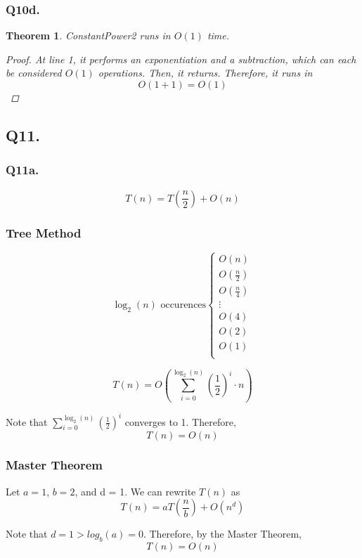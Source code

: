 \documentclass{article}
\newtheorem{theorem}{Theorem}
\theoremstyle{definition}
\begin{document}
\subsubsection{Q10d.}
\begin{theorem}
    ConstantPower2 runs in $O(1)$ time. 
    \begin{proof}
        At line 1, it performs an exponentiation and a subtraction, which can each be considered $O(1)$ operations. Then, it returns. Therefore, it runs in 
        $$O(1 + 1) = O(1)$$
    \end{proof}
\end{theorem}

\subsection{Q11.}
\subsubsection{Q11a.}
$$T(n) = T\left(\frac{n}{2}\right) + O(n)$$

\subsubsection*{Tree Method}
$$\log_2(n)\text{ occurences} \begin{cases}
    O(n)  \\
    O(\frac{n}{2})  \\
    O(\frac{n}{4})  \\
    \vdots \\
    O(4)  \\
    O(2)  \\
    O(1)  \\
\end{cases}$$

$$T(n) = O\left( \sum^{\log_2(n)}_{i=0} \left( \frac{1}{2} \right)^i \cdot n \right)$$

Note that $\sum^{\log_2(n)}_{i=0} \left( \frac{1}{2} \right)^i$ converges to 1. Therefore, 
$$T(n) = O(n)$$

\subsubsection*{Master Theorem}

Let $a = 1$, $b = 2$, and d = 1. We can rewrite $T(n)$ as
$$T(n) = aT\left(\frac{n}{b}\right) + O(n^d)$$

Note that $d = 1 > log_b(a) = 0$. Therefore, by the Master Theorem,
$$T(n) = O(n)$$
\end{document}
